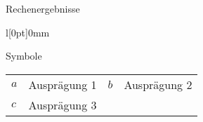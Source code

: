 \documentclass[english, ngerman, a0paper, fontsize=30pt,
cdfont=false,cdfont=nodin,cdmath=false,
cdgeometry=custom,
bleedmargin=3mm,
backgroundcolor=white,
]{./settings/tudscrposter}
\begin{document}
\bigskip





\begin{testbox}{Rechenergebnisse}
	\begin{wrapfigure}[10]{l}[0pt]{0mm} %
	\end{wrapfigure}
	\blindtext[2]
\end{testbox}



\bigskip



\noindent
\begin{minipage}{0.25\textwidth}
	\begin{mybox}{Symbole}
		\begin{tabular}{@{}ll@{\quad}ll@{}}
			$a$ & Ausprägung 1 & $b$ & Ausprägung 2\\
			$c$ & Ausprägung 3 & &
		\end{tabular}
	\end{mybox}
\end{minipage}
\end{document}
